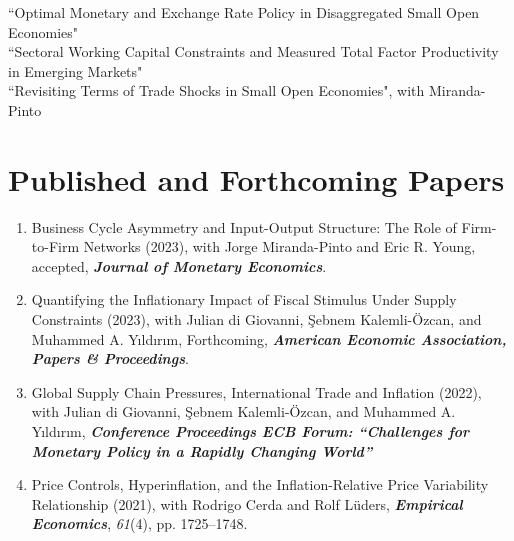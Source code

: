 \documentclass[10pt]{article}
\begin{document}
\noindent ``Optimal Monetary and Exchange Rate Policy in Disaggregated Small Open Economies"\\[-0.125in]

\noindent ``Sectoral Working Capital Constraints and Measured Total Factor Productivity in Emerging Markets"\\[-0.125in]

\noindent ``Revisiting Terms of Trade Shocks in Small Open Economies", with Miranda-Pinto





\section*{Published and Forthcoming Papers}
\iffalse
\begin{enumerate}[wide, labelwidth=!,labelindent=5pt]
    \item Business Cycle Asymmetry and Input-Output Structure: The Role of Firm-to-Firm Networks (2023), with Jorge Miranda-Pinto and Eric R. Young, accepted, \emph{\bfseries Journal of Monetary Economics}.
    \item Quantifying the Inflationary Impact of Fiscal Stimulus Under Supply Constraints (2023), with Julian di Giovanni, \c{S}ebnem Kalemli-\"{O}zcan, and Muhammed A. Y{\i}ld{\i}r{\i}m, Forthcoming, \emph{\bfseries American Economic Association, Papers \& Proceedings}.
    \item Global Supply Chain Pressures, International Trade and Inflation (2022), with Julian di Giovanni, \c{S}ebnem Kalemli-\"{O}zcan, and Muhammed A. Y{\i}ld{\i}r{\i}m,  \textit{\bfseries Conference Proceedings ECB Forum: ``Challenges for Monetary Policy in a Rapidly Changing World''}
    \item Price Controls, Hyperinflation, and the Inflation-Relative Price Variability Relationship (2021), with Rodrigo Cerda and Rolf L\"{u}ders,  \textbf{\textit{Empirical Economics}}, \emph{61}(4), pp. 1725--1748.
\end{enumerate}
\end{document}
